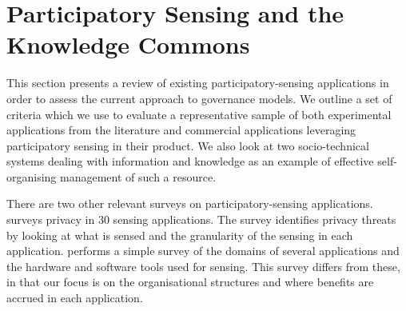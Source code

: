 













\section{Participatory Sensing and the Knowledge Commons}\label{sec:review}

This section presents a review of existing participatory-sensing applications in order to assess the current approach to governance models.  
We outline a set of criteria which we use to evaluate a representative sample of both experimental applications from the literature and commercial applications leveraging participatory sensing in their product. 
We also look at two socio-technical systems dealing with information and knowledge as an example of effective self-organising management of such a resource.

There are two other relevant surveys on participatory-sensing applications. 
 surveys privacy in 30 sensing applications. The survey identifies privacy threats by looking at what is sensed and the granularity of the sensing in each application. 
 performs a simple survey of the domains of several applications and the hardware and software tools used for sensing. 
This survey differs from these, in that our focus is on the organisational structures and where benefits are accrued in each application.

